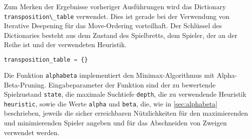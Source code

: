 Zum Merken der Ergebnisse vorheriger Ausführungen wird das Dictionary
\passthrough{\lstinline!transposition\_table!} verwendet. Dies ist
gerade bei der Verwendung von Iterative Deepening für das Move-Ordering
vorteilhaft. Der Schlüssel des Dictionaries besteht aus dem Zustand des
Spielbretts, dem Spieler, der an der Reihe ist und der verwendeten
Heuristik.

\begin{lstlisting}[language=Python]
transposition_table = {}
\end{lstlisting}

Die Funktion \passthrough{\lstinline!alphabeta!} implementiert den
Minimax-Algorithmus mit Alpha-Beta-Pruning. Eingabeparameter der
Funktion sind der zu bewertende Spielzustand
\passthrough{\lstinline!state!}, die maximale Suchtiefe
\passthrough{\lstinline!depth!}, die zu verwendende Heuristik
\passthrough{\lstinline!heuristic!}, sowie die Werte
\passthrough{\lstinline!alpha!} und \passthrough{\lstinline!beta!}, die,
wie in \autoref{sec:alphabeta} beschrieben, jeweils die sicher
erreichbaren Nützlichkeiten für den maximierenden und minimierenden
Spieler angeben und für das Abschneiden von Zweigen verwendet werden.

